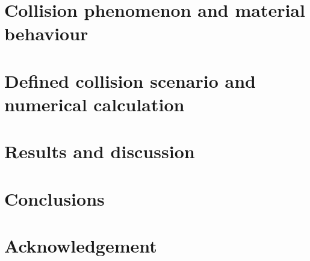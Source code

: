 \documentclass[10pt,journal]{IEEEtran}
\begin{document}

\section{Collision phenomenon and material behaviour}






\section{Defined collision scenario and numerical calculation}





\section{Results and discussion }





\section{Conclusions}






\section*{Acknowledgement} 






\end{document}
